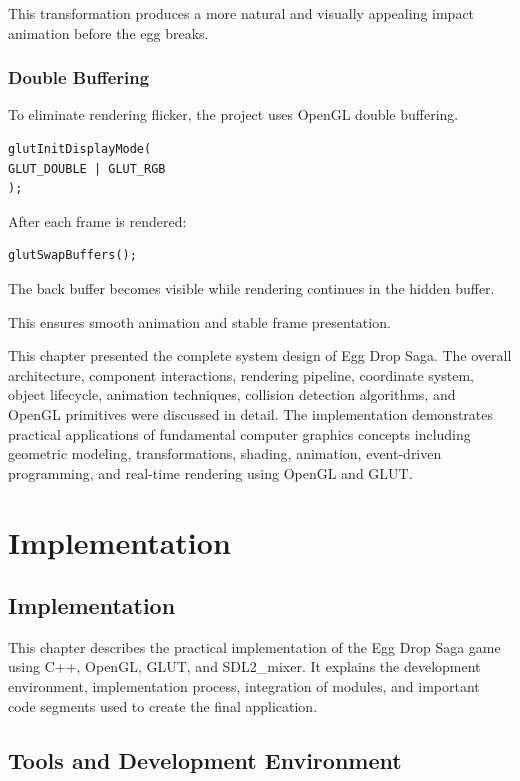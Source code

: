 \documentclass[12pt,a4paper]{report}
\begin{document}
This transformation produces a more natural and visually appealing impact animation before the egg breaks.

\subsection*{Double Buffering}

To eliminate rendering flicker, the project uses OpenGL double buffering.

\begin{verbatim}
glutInitDisplayMode(
GLUT_DOUBLE | GLUT_RGB
);
\end{verbatim}

After each frame is rendered:

\begin{verbatim}
glutSwapBuffers();
\end{verbatim}

The back buffer becomes visible while rendering continues in the hidden buffer.

This ensures smooth animation and stable frame presentation.



This chapter presented the complete system design of Egg Drop Saga. The overall architecture, component interactions, rendering pipeline, coordinate system, object lifecycle, animation techniques, collision detection algorithms, and OpenGL primitives were discussed in detail. The implementation demonstrates practical applications of fundamental computer graphics concepts including geometric modeling, transformations, shading, animation, event-driven programming, and real-time rendering using OpenGL and GLUT.




\chapter{Implementation}
\section{Implementation}

This chapter describes the practical implementation of the Egg Drop Saga game using C++, OpenGL, GLUT, and SDL2\_mixer. It explains the development environment, implementation process, integration of modules, and important code segments used to create the final application.

\section{Tools and Development Environment}
\end{document}

